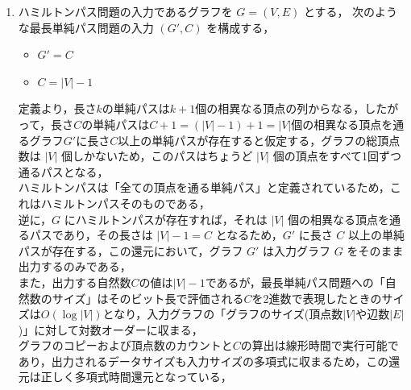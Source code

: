 \documentclass[dvipdfmx]{jsreport}
\begin{document}
\begin{souanswer}
\begin{enumerate}
	\item ハミルトンパス問題の入力であるグラフを $G=(V, E)$ とする，
	次のような最長単純パス問題の入力 $(G', C)$ を構成する，
\begin{itemize}
	\item $G'= C$
	\item $C= |V|- 1$
\end{itemize}
	定義より，長さ$k$の単純パスは$k+ 1$個の相異なる頂点の列からなる，したがって，長さ$C$の単純パスは$C+ 1= (|V|- 1)+ 1= |V|$個の相異なる頂点を通るグラフ$G'$に長さ$C$以上の単純パスが存在すると仮定する，グラフの総頂点数は $|V|$ 個しかないため，このパスはちょうど $|V|$ 個の頂点をすべて1回ずつ通るパスとなる，\\
	ハミルトンパスは「全ての頂点を通る単純パス」と定義されているため，これはハミルトンパスそのものである，\\
	逆に，$G$ にハミルトンパスが存在すれば，それは $|V|$ 個の相異なる頂点を通るパスであり，その長さは $|V|- 1= C$ となるため，$G'$ に長さ $C$ 以上の単純パスが存在する，この還元において，グラフ $G'$ は入力グラフ $G$ をそのまま出力するのみである，\\
	また，出力する自然数$C$の値は$|V|- 1$であるが，最長単純パス問題への「自然数のサイズ」はそのビット長で評価される$C$を2進数で表現したときのサイズは$O(\log|V|)$となり，入力グラフの「グラフのサイズ(頂点数$|V|$や辺数$|E|$)」に対して対数オーダーに収まる，\\
	グラフのコピーおよび頂点数のカウントと$C$の算出は線形時間で実行可能であり，出力されるデータサイズも入力サイズの多項式に収まるため，この還元は正しく多項式時間還元となっている，
\end{enumerate}
\end{souanswer}
\end{document}
